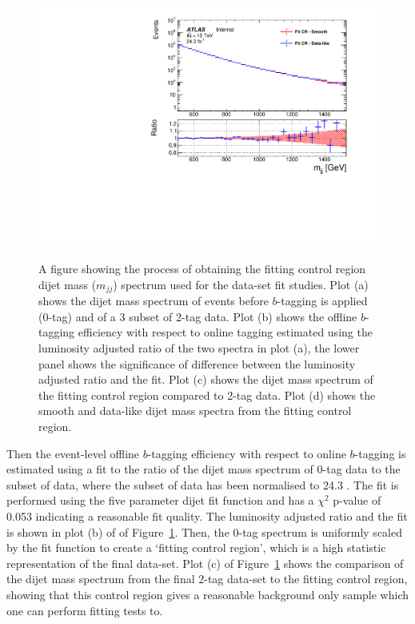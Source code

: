 \begin{figure}[!htb]
{  \includegraphics[width=0.51\linewidth, angle=0]{figs/Dibjet/LowMass/FitStudy/corrFitCR_smooth_dataLike.pdf}
}
\hspace{-2mm}
\vspace{10pt}
\caption{\label{fig:fittingCR}
  A figure showing the process of obtaining the fitting control region dijet mass ($m_{jj}$) spectrum
  used for the \lm{} data-set fit studies.
  Plot (a) shows the dijet mass spectrum of events before $b$-tagging is applied (0-tag) and of a 3 \ifb{} subset of 2-tag data.
  Plot (b) shows the offline $b$-tagging efficiency with respect to online tagging estimated using the luminosity adjusted ratio of the two spectra in plot (a),
  the lower panel shows the significance of difference between the luminosity adjusted ratio and the fit.
  Plot (c) shows the dijet mass spectrum of the fitting control region compared to 2-tag data.
  Plot (d) shows the smooth and data-like dijet mass spectra from the fitting control region.
}
\end{figure}

Then the event-level offline $b$-tagging efficiency with respect to online $b$-tagging is estimated using a fit to the ratio
of the dijet mass spectrum of 0-tag data to the subset of data, where the subset of data has been normalised to 24.3 \ifb{}.
The fit is performed using the five parameter dijet fit function and has a $\chi^2$ p-value of 0.053 indicating a reasonable fit quality.
The luminosity adjusted ratio and the fit is shown in plot (b) of of Figure~\ref{fig:fittingCR}.
Then, the 0-tag spectrum is uniformly scaled by the fit function to create a `fitting control region', which is a high statistic representation of the final data-set.
Plot (c) of Figure~\ref{fig:fittingCR} shows the comparison of the dijet mass spectrum from the final 2-tag data-set to the fitting control region,
showing that this control region gives a reasonable background only sample which one can perform fitting tests to.

